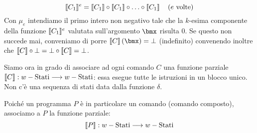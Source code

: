 \documentclass{lectures}
\begin{document}
\begin{multicols}{2}
\begin{definition}
\begin{description}
            \[
                \llbracket C_1\rrbracket^e = \llbracket C_1\rrbracket \circ \llbracket C_1\rrbracket \circ \ldots \circ \llbracket C_1\rrbracket \quad \left(e \text{ volte}\right)
            \]
            Con \(\mu_e\) intendiamo il primo intero non negativo tale che la \(k\)-esima componente della funzione \(\llbracket C_1\rrbracket^e\) valutata sull'argomento \(\bmx\) risulta \(0\).
            Se questo non succede mai, conveniamo di porre \(\ssqr{C}\rnd{\bmx} = \bot\) (indefinito) convenendo inoltre che \(\llbracket C\rrbracket \circ \bot = \bot \circ \llbracket C\rrbracket = \bot\).
            
            Siamo ora in grado di associare ad ogni comando \(C\) una funzione parziale \(\llbracket C\rrbracket:w-\text{Stati}\longrightarrow w-\text{Stati}\): essa esegue tutte le istruzioni in un blocco unico. Non c'è una sequenza di stati data dalla funzione \(\delta\).
            
            Poiché un programma \(P\) è in particolare un comando (comando composto), associamo a \(P\) la funzione parziale:
            \[
                \llbracket P\rrbracket:w-\text{Stati}\longrightarrow w-\text{Stati}
            \]
        \end{description}
    \end{definition}
\end{multicols}
\clearpage
\end{document}
